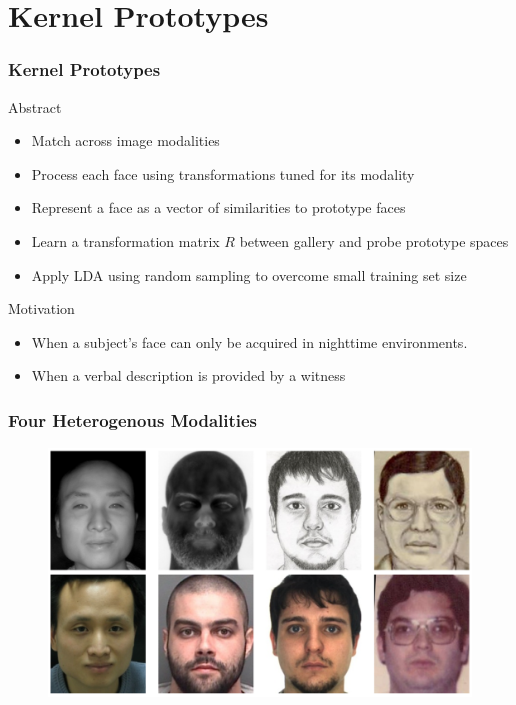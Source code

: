 \documentclass{beamer}
\begin{document}
\section{Kernel Prototypes}
\begin{frame}
\frametitle{Kernel Prototypes}
\begin{block}{Abstract}
\begin{itemize}
\item Match across image modalities
\item Process each face using transformations tuned for its modality
\item Represent a face as a vector of similarities to prototype faces
\item Learn a transformation matrix $R$ between gallery and probe prototype spaces
\item Apply LDA using random sampling to overcome small training set size
\end{itemize}
\end{block}
\pause
\begin{block}{Motivation}
\begin{itemize}
\item When a subject's face can only be acquired in nighttime environments.
\item When a verbal description is provided by a witness
\end{itemize}
\end{block}
\end{frame}

\begin{frame}
\frametitle{Four Heterogenous Modalities}
\begin{figure}
\includegraphics[width=\textwidth]{heterogeneous}
\end{figure}
\end{frame}
\end{document}
